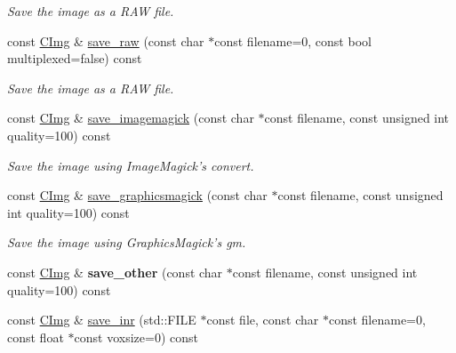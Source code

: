 \begin{DoxyCompactItemize}
\begin{DoxyCompactList}\small\item\em Save the image as a R\-A\-W file. \end{DoxyCompactList}\item 
\hypertarget{structcimg__library_1_1_c_img_acd6ec0c7c53733bef57bca68651c8394}{const \hyperlink{structcimg__library_1_1_c_img}{C\-Img} \& \hyperlink{structcimg__library_1_1_c_img_acd6ec0c7c53733bef57bca68651c8394}{save\-\_\-raw} (const char $\ast$const filename=0, const bool multiplexed=false) const }\label{structcimg__library_1_1_c_img_acd6ec0c7c53733bef57bca68651c8394}

\begin{DoxyCompactList}\small\item\em Save the image as a R\-A\-W file. \end{DoxyCompactList}\item 
const \hyperlink{structcimg__library_1_1_c_img}{C\-Img} \& \hyperlink{structcimg__library_1_1_c_img_a6414cc4030892b8ae825a274dec26ab8}{save\-\_\-imagemagick} (const char $\ast$const filename, const unsigned int quality=100) const 
\begin{DoxyCompactList}\small\item\em Save the image using Image\-Magick's convert. \end{DoxyCompactList}\item 
const \hyperlink{structcimg__library_1_1_c_img}{C\-Img} \& \hyperlink{structcimg__library_1_1_c_img_acd56ecc64c775ee50dfedc4ef9855ab3}{save\-\_\-graphicsmagick} (const char $\ast$const filename, const unsigned int quality=100) const 
\begin{DoxyCompactList}\small\item\em Save the image using Graphics\-Magick's gm. \end{DoxyCompactList}\item 
\hypertarget{structcimg__library_1_1_c_img_ad2d72f85340d7c859c8cd7a52621756b}{const \hyperlink{structcimg__library_1_1_c_img}{C\-Img} \& {\bfseries save\-\_\-other} (const char $\ast$const filename, const unsigned int quality=100) const }\label{structcimg__library_1_1_c_img_ad2d72f85340d7c859c8cd7a52621756b}

\item 
\hypertarget{structcimg__library_1_1_c_img_a1ca63e722e7ad2993bd04c24f29ad9e4}{const \hyperlink{structcimg__library_1_1_c_img}{C\-Img} \& \hyperlink{structcimg__library_1_1_c_img_a1ca63e722e7ad2993bd04c24f29ad9e4}{save\-\_\-inr} (std\-::\-F\-I\-L\-E $\ast$const file, const char $\ast$const filename=0, const float $\ast$const voxsize=0) const }\label{structcimg__library_1_1_c_img_a1ca63e722e7ad2993bd04c24f29ad9e4}


\end{DoxyCompactItemize}
